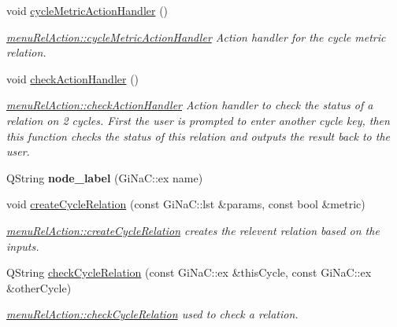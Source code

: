\begin{DoxyCompactItemize}
void \mbox{\hyperlink{classmenu_rel_action_adbd43b99466f9ad2cde1934e1599ae4c}{cycle\+Metric\+Action\+Handler}} ()
\begin{DoxyCompactList}\small\item\em \mbox{\hyperlink{classmenu_rel_action_adbd43b99466f9ad2cde1934e1599ae4c}{menu\+Rel\+Action\+::cycle\+Metric\+Action\+Handler}} Action handler for the cycle metric relation. \end{DoxyCompactList}\item 
\mbox{\label{classmenu_rel_action_a1535eb0d2ad06bd4d44f3de8761841b2}} 
void \mbox{\hyperlink{classmenu_rel_action_a1535eb0d2ad06bd4d44f3de8761841b2}{check\+Action\+Handler}} ()
\begin{DoxyCompactList}\small\item\em \mbox{\hyperlink{classmenu_rel_action_a1535eb0d2ad06bd4d44f3de8761841b2}{menu\+Rel\+Action\+::check\+Action\+Handler}} Action handler to check the status of a relation on 2 cycles. First the user is prompted to enter another cycle key, then this function checks the status of this relation and outputs the result back to the user. \end{DoxyCompactList}\item 
\mbox{\label{classmenu_rel_action_a157ae072f7e1622564ff68583bb73132}} 
Q\+String {\bfseries node\+\_\+label} (Gi\+Na\+C\+::ex name)
\item 
void \mbox{\hyperlink{classmenu_rel_action_a64a27674825379ba110fb2117a572ffe}{create\+Cycle\+Relation}} (const Gi\+Na\+C\+::lst \&params, const bool \&metric)
\begin{DoxyCompactList}\small\item\em \mbox{\hyperlink{classmenu_rel_action_a64a27674825379ba110fb2117a572ffe}{menu\+Rel\+Action\+::create\+Cycle\+Relation}} creates the relevent relation based on the inputs. \end{DoxyCompactList}\item 
Q\+String \mbox{\hyperlink{classmenu_rel_action_ab3a724c2d09de8a3d253210ec3a0e0d3}{check\+Cycle\+Relation}} (const Gi\+Na\+C\+::ex \&this\+Cycle, const Gi\+Na\+C\+::ex \&other\+Cycle)
\begin{DoxyCompactList}\small\item\em \mbox{\hyperlink{classmenu_rel_action_ab3a724c2d09de8a3d253210ec3a0e0d3}{menu\+Rel\+Action\+::check\+Cycle\+Relation}} used to check a relation. \end{DoxyCompactList}\end{DoxyCompactItemize}
